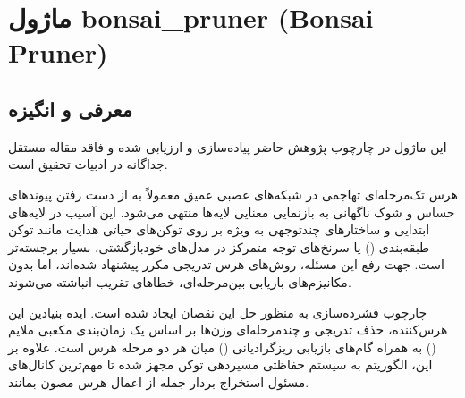 \section{ماژول bonsai\_pruner (Bonsai Pruner)}
\label{sec:module_bonsai_pruner}

\subsection{معرفی و انگیزه}
این ماژول در چارچوب پژوهش حاضر پیاده‌سازی و ارزیابی شده و فاقد مقاله مستقل جداگانه در ادبیات تحقیق است.

هرس تک‌مرحله‌ای تهاجمی در شبکه‌های عصبی عمیق معمولاً به از دست رفتن پیوندهای حساس و شوک ناگهانی به بازنمایی معنایی لایه‌ها منتهی می‌شود. این آسیب در لایه‌های ابتدایی و ساختارهای چندتوجهی به ویژه بر روی توکن‌های حیاتی هدایت مانند توکن طبقه‌بندی (\lr{[CLS]}) یا سرنخ‌های توجه متمرکز در مدل‌های خودبازگشتی، بسیار برجسته‌تر است. جهت رفع این مسئله، روش‌های هرس تدریجی مکرر پیشنهاد شده‌اند، اما بدون مکانیزم‌های بازیابی بین‌مرحله‌ای، خطاهای تقریب انباشته می‌شوند.

چارچوب فشرده‌سازی  به منظور حل این نقصان ایجاد شده است. ایده بنیادین این هرس‌کننده، حذف تدریجی و چندمرحله‌ای وزن‌ها بر اساس یک زمان‌بندی مکعبی ملایم () به همراه گام‌های بازیابی ریزگرادیانی () میان هر دو مرحله هرس است. علاوه بر این، الگوریتم به سیستم حفاظتی مسیردهی توکن \lr{[CLS]} مجهز شده تا مهم‌ترین کانال‌های مسئول استخراج بردار جمله از اعمال هرس مصون بمانند.

